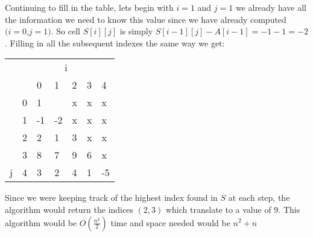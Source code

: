 \documentclass[12pt]{article}
\begin{document}
Continuing to fill in the table, lets begin with $i=1$ and $j=1$ we already have all the information we need to know this value since we have already computed $(i=0$,$j=1)$. So cell $S[i][j]$ is simply $S[i-1][j] - A[i-1] = -1 - 1 = -2$. Filling in all the subsequent indexes the same way we get:
\begin{center}
\begin{tabular}{lllllll}
                    & \multicolumn{6}{c}{i}                                                                                                                                                                   \\
                    &                        & 0  & 1                                                & 2                         & 3                         & 4                                              \\ \cline{3-7} 
                    & \multicolumn{1}{l|}{0} & 1  & \cellcolor[HTML]{FFCCC9}{\color[HTML]{000000} x} & \cellcolor[HTML]{FFCCC9}x & \cellcolor[HTML]{FFCCC9}x & \multicolumn{1}{l|}{\cellcolor[HTML]{FFCCC9}x} \\
                    & \multicolumn{1}{l|}{1} & -1 & -2                                               & \cellcolor[HTML]{FFCCC9}x & \cellcolor[HTML]{FFCCC9}x & \multicolumn{1}{l|}{\cellcolor[HTML]{FFCCC9}x} \\
                    & \multicolumn{1}{l|}{2} & 2  & 1                                                & 3                         & \cellcolor[HTML]{FFCCC9}x & \multicolumn{1}{l|}{\cellcolor[HTML]{FFCCC9}x} \\
                    & \multicolumn{1}{l|}{3} & 8  & 7                                                & 9                         & 6                         & \multicolumn{1}{l|}{\cellcolor[HTML]{FFCCC9}x} \\
\multirow{-6}{*}{j} & \multicolumn{1}{l|}{4} & 3  & 2                                                & 4                         & 1                         & \multicolumn{1}{l|}{-5}                        \\ \cline{3-7} 
\end{tabular}
\end{center}

Since we were keeping track of the highest index found in $S$ at each step, the algorithm would return the indices $(2,3)$ which translate to a value of $9$. This algorithm would be $O(\frac{n^2}{2})$ time and space needed would be $n^2 + n$
\end{document}
